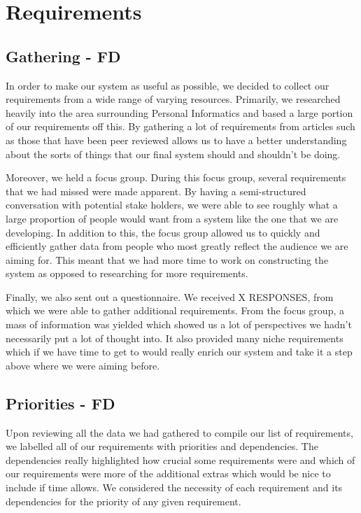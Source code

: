\documentclass[12pt]{report}
\begin{document}
\chapter{Requirements}

\section{Gathering - FD}

In order to make our system as useful as possible, we decided to collect our requirements from a wide range of varying resources. Primarily, we researched heavily into the area surrounding Personal Informatics and based a large portion of our requirements off this. By gathering a lot of requirements from articles such as those that have been peer reviewed allows us to have a better understanding about the sorts of things that our final system should and shouldn’t be doing.

Moreover, we held a focus group. During this focus group, several requirements that we had missed were made apparent. By having a semi-structured conversation with potential stake holders, we were able to see roughly what a large proportion of people would want from a system like the one that we are developing. In addition to this, the focus group allowed us to quickly and efficiently gather data from people who most greatly reflect the audience we are aiming for. This meant that we had more time to work on constructing the system as opposed to researching for more requirements.

Finally, we also sent out a questionnaire. We received X RESPONSES, from which we were able to gather additional requirements. From the focus group, a mass of information was yielded which showed us a lot of perspectives we hadn’t necessarily put a lot of thought into. It also provided many niche requirements which if we have time to get to would really enrich our system and take it a step above where we were aiming before.

\section{Priorities - FD}

Upon reviewing all the data we had gathered to compile our list of requirements, we labelled all of our requirements with priorities and dependencies. The dependencies really highlighted how crucial some requirements were and which of our requirements were more of the additional extras which would be nice to include if time allows. We considered the necessity of each requirement and its dependencies for the priority of any given requirement.
\end{document}
